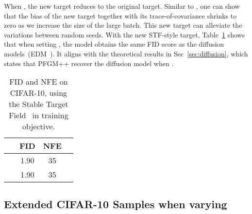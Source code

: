 When , the new target reduces to the original target. Similar to \cite{Xu2023StableTF}, one can show that the bias of the new target together with its trace-of-covariance shrinks to zero as we increase the size of the large batch. This new target can alleviate the variations between random seeds. With the new STF-style target, Table~\ref{tab:cifar-stf} shows that when setting , the model obtains the same FID score as the diffusion models~(EDM~\cite{Karras2022ElucidatingTD}). It aligns with the theoretical results in Sec~\ref{sec:diffusion}, which states that PFGM++ recover the diffusion model when . 
\begin{table}[htbp]
    \small
    \centering
    \caption{FID and NFE on CIFAR-10, using the Stable Target Field~\cite{Xu2023StableTF} in training objective.}
    \begin{tabular}{l c c c}
    \toprule
         &FID  & NFE \\
        \midrule
          &1.90 & 35\\
        ~\cite{Karras2022ElucidatingTD}  &1.90 & 35\\
        \bottomrule
    \end{tabular}
    \label{tab:cifar-stf}
\end{table}


\subsection{Extended CIFAR-10 Samples when varying }
\label{app:robust}


